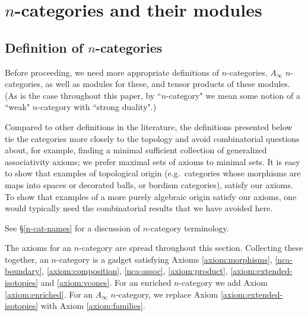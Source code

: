 
\def\xxpar#1#2{\smallskip\noindent{\bf #1} {\it #2} \smallskip}
\def\mmpar#1#2#3{\smallskip\noindent{\bf #1} (#2). {\it #3} \smallskip}

\section{\texorpdfstring{$n$}{n}-categories and their modules}
\label{sec:ncats}

\subsection{Definition of \texorpdfstring{$n$}{n}-categories}
\label{ss:n-cat-def}

Before proceeding, we need more appropriate definitions of $n$-categories, 
$A_\infty$ $n$-categories, as well as modules for these, and tensor products of these modules.
(As is the case throughout this paper, by ``$n$-category" we mean some notion of
a ``weak" $n$-category with ``strong duality".)

Compared to other definitions in the literature,
the definitions presented below tie the categories more closely to the topology
and avoid combinatorial questions about, for example, finding a minimal sufficient
collection of generalized associativity axioms; we prefer maximal sets of axioms to minimal sets.
It is easy to show that examples of topological origin
(e.g.\ categories whose morphisms are maps into spaces or decorated balls, or bordism categories), 
satisfy our axioms.
To show that examples of a more purely algebraic origin satisfy our axioms, 
one would typically need the combinatorial
results that we have avoided here.

See \S\ref{n-cat-names} for a discussion of $n$-category terminology.


\medskip

The axioms for an $n$-category are spread throughout this section.
Collecting these together, an $n$-category is a gadget satisfying Axioms \ref{axiom:morphisms}, 
\ref{nca-boundary}, \ref{axiom:composition},  \ref{nca-assoc}, \ref{axiom:product}, \ref{axiom:extended-isotopies} and  \ref{axiom:vcones}.
For an enriched $n$-category we add Axiom \ref{axiom:enriched}.
For an $A_\infty$ $n$-category, we replace 
Axiom \ref{axiom:extended-isotopies} with Axiom \ref{axiom:families}.

